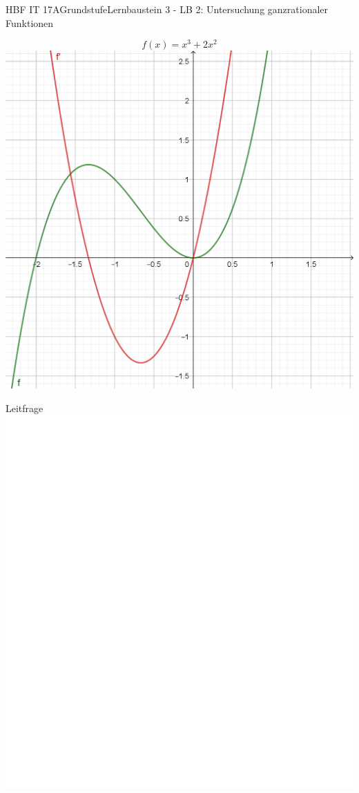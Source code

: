 \documentclass[oneside,openany,headings=optiontotoc,11pt,numbers=noenddot]{scrreprt}
\begin{document}
	\begin{worksheet}{HBF IT 17A}{Grundstufe}{Lernbaustein 3 - LB 2: Untersuchung ganzrationaler Funktionen}

		\begin{framed}
			\noindent
			\[f(x) = x^3 +2x^2\]
			\includegraphics[scale=0.65]{Bilder/WPf.png}
		\end{framed}
	
		\begin{framed}
			\noindent
			\tiny{\color{codegray}Leitfrage}\\
			\includegraphics[scale=0.15]{../empty.jpg}
		\end{framed}
	\end{worksheet}
\end{document}
